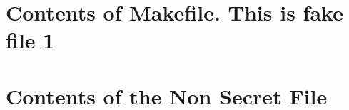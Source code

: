 \documentclass{article}
\begin{document}
\section*{Contents of Makefile. This is fake file 1}


\section*{Contents of the Non Secret File}



\end{document}
